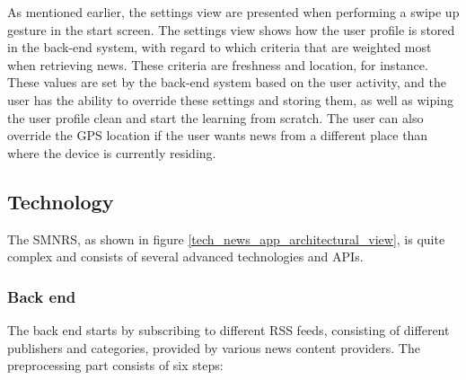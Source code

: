 As mentioned earlier, the settings view are presented when performing a swipe up gesture in the start screen. The settings view shows how the user profile is stored in the back-end system, with regard to which criteria that are weighted most when retrieving news. These criteria are freshness and location, for instance. These values are set by the back-end system based on the user activity, and the user has the ability to override these settings and storing them, as well as wiping the user profile clean and start the learning from scratch. The user can also override the GPS location if the user wants news from a different place than where the device is currently residing.


\subsection{Technology}
The SMNRS, as shown in figure \ref{tech_news_app_architectural_view}, is quite complex and consists of several advanced technologies and APIs.

\subsubsection{Back end}
The back end starts by subscribing to different RSS feeds, consisting of different publishers and categories, provided by various news content providers. The preprocessing part consists of six steps:

